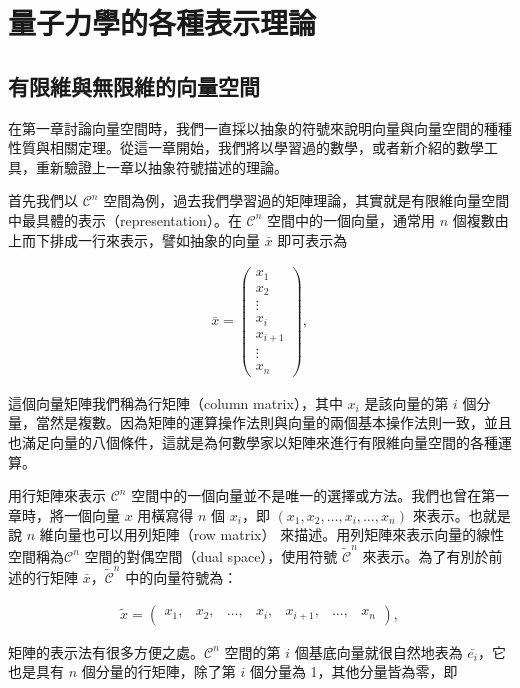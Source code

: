 \chapter{量子力學的各種表示理論}

\section{有限維與無限維的向量空間}

在第一章討論向量空間時，我們一直採以抽象的符號來說明向量與向量空間的種種性質與相關定理。從這一章開始，我們將以學習過的數學，或者新介紹的數學工具，重新驗證上一章以抽象符號描述的理論。

首先我們以 $\mathcal{C}^n$ 空間為例，過去我們學習過的矩陣理論，其實就是有限維向量空間中最具體的表示（representation）。在 $\mathcal{C}^n$ 空間中的一個向量，通常用 $n$ 個複數由上而下排成一行來表示，譬如抽象的向量 $ \bar{x} $ 即可表示為

\begin{align}
\bar{x}=\begin{pmatrix}x_1\\x_2\\\vdots\\x_i\\x_{i+1}\\\vdots\\x_n\end{pmatrix},
\end{align}

\noindent 這個向量矩陣我們稱為行矩陣（column matrix），其中 $x_i$ 是該向量的第 $i$ 個分量，當然是複數。因為矩陣的運算操作法則與向量的兩個基本操作法則一致，並且也滿足向量的八個條件，這就是為何數學家以矩陣來進行有限維向量空間的各種運算。

用行矩陣來表示 $\mathcal{C}^n$ 空間中的一個向量並不是唯一的選擇或方法。我們也曾在第一章時，將一個向量 $x$ 用橫寫得 $n$ 個 $x_i$，即 $(x_1, x_2, \ldots, x_i, \ldots, x_n)$ 來表示。也就是說 $n$ 維向量也可以用列矩陣（row matrix） 來描述。用列矩陣來表示向量的線性空間稱為$\mathcal{C}^n$ 空間的對偶空間（dual space），使用符號 $ \tilde{\mathcal{C}}^n $ 來表示。為了有別於前述的行矩陣 $\bar{x}$，$ \tilde{\mathcal{C}}^n $ 中的向量符號為：

\begin{align}
\tilde{x}=\begin{pmatrix}x_1,&x_2,&\ldots, & x_i, & x_{i+1}, & \ldots, & x_n \end{pmatrix},
\end{align}

矩陣的表示法有很多方便之處。$\mathcal{C}^n$ 空間的第 $i$ 個基底向量就很自然地表為 $\bar{e_i}$，它也是具有 $n$ 個分量的行矩陣，除了第 $i$ 個分量為 1，其他分量皆為零，即

